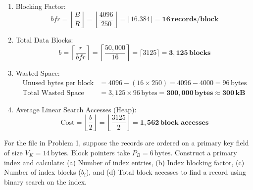 \documentclass[11pt,a4paper]{article}
\newenvironment{Problem}[1][Problem Scenario]{\begin{tcolorbox}[problembox, title=#1]}{\end{tcolorbox}}
\newenvironment{Solution}[1][Step-by-Step Solution]{\begin{tcolorbox}[solbox, title=#1]}{\end{tcolorbox}}
\begin{document}
\begin{Solution}
\begin{enumerate}
  \item Blocking Factor:
    \begin{equation*}
      bfr = \left\lfloor \frac{B}{R} \right\rfloor = \left\lfloor \frac{4096}{250} \right\rfloor = \lfloor 16.384 \rfloor = \mathbf{16\,\text{records/block}}
    \end{equation*}
  \item Total Data Blocks:
    \begin{equation*}
      b = \left\lceil \frac{r}{bfr} \right\rceil = \left\lceil \frac{50,000}{16} \right\rceil = \lceil 3125 \rceil = \mathbf{3,125\,\text{blocks}}
    \end{equation*}
  \item Wasted Space:
    \begin{align*}
      \text{Unused bytes per block} &= 4096 - (16 \times 250) = 4096 - 4000 = 96\,\text{bytes} \\
      \text{Total Wasted Space} &= 3,125 \times 96\,\text{bytes} = \mathbf{300,000\,\text{bytes}} \approx \mathbf{300\,\text{kB}}
    \end{align*}
  \item Average Linear Search Accesses (Heap):
    \begin{equation*}
      \text{Cost} = \left\lfloor \frac{b}{2} \right\rfloor = \left\lfloor \frac{3125}{2} \right\rfloor = \mathbf{1,562\,\text{block accesses}}
    \end{equation*}
\end{enumerate}
\end{Solution}

\begin{Problem}[Problem 2: Primary Index Storage and Search Performance]
For the file in Problem 1, suppose the records are ordered on a primary key field of size $V_K = 14\,\text{bytes}$. Block pointers take $P_B = 6\,\text{bytes}$. Construct a primary index and calculate: (a) Number of index entries, (b) Index blocking factor, (c) Number of index blocks ($b_i$), and (d) Total block accesses to find a record using binary search on the index.
\end{Problem}
\end{document}
